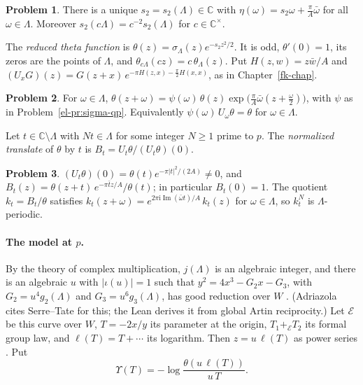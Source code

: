 \documentclass[reqno]{amsart}
\newcounter{chap}
\theoremstyle{definition}
\newtheorem{problem}{Problem}[section]
\theoremstyle{plain}
\theoremstyle{remark}
\newcommand{\C}{\mathbb C}
\newcommand{\Ec}{\mathcal E}
\newcommand{\ii}{\mathrm i}
\newcommand{\pe}{+_{\Ec}}
\begin{document}
\begin{problem}\label{pr:s2}
There is a unique \(s_2=s_2(\Lambda)\in\C\) with \(\eta(\omega)=s_2\omega+\frac\pi A\bar\omega\) for all \(\omega\in\Lambda\).  Moreover \(s_2(c\Lambda)=c^{-2}s_2(\Lambda)\) for \(c\in\C^\times\).
\end{problem}

The \emph{reduced theta function} is \(\theta(z)=\sigma_\Lambda(z)e^{-s_2z^2/2}\).  It is odd, \(\theta'(0)=1\), its zeros are the points of \(\Lambda\), and \(\theta_{c\Lambda}(cz)=c\,\theta_\Lambda(z)\).  Put \(H(z,w)=z\bar w/A\) and \((U_xG)(z)=G(z+x)\,e^{-\pi H(z,x)-\frac\pi2H(x,x)}\), as in Chapter~\ref{fk-chap}.

\begin{problem}\label{pr:theta-qp}
For \(\omega\in\Lambda\), \(\theta(z+\omega)=\psi(\omega)\,\theta(z)\exp\big(\frac\pi A\bar\omega(z+\frac\omega2)\big)\), with \(\psi\) as in Problem~\ref{el-pr:sigma-qp}.  Equivalently \(\psi(\omega)\,U_\omega\theta=\theta\) for \(\omega\in\Lambda\).
\end{problem}

Let \(t\in\C\setminus\Lambda\) with \(Nt\in\Lambda\) for some integer \(N\ge1\) prime to \(p\).  The \emph{normalized translate} of \(\theta\) by \(t\) is \(B_t=U_t\theta/(U_t\theta)(0)\).

\begin{problem}\label{pr:Bt}
\((U_t\theta)(0)=\theta(t)e^{-\pi\lvert t\rvert^2/(2A)}\ne0\), and \(B_t(z)=\theta(z+t)\,e^{-\pi\bar tz/A}/\theta(t)\); in particular \(B_t(0)=1\).  The quotient \(k_t=B_t/\theta\) satisfies \(k_t(z+\omega)=e^{2\pi\ii\operatorname{Im}(\bar\omega t)/A}\,k_t(z)\) for \(\omega\in\Lambda\), so \(k_t^N\) is \(\Lambda\)-periodic.
\end{problem}

\paragraph{The model at \(p\).}  By the theory of complex multiplication, \(j(\Lambda)\) is an algebraic integer, and there is an algebraic \(u\) with \(\lvert\iota(u)\rvert=1\) such that \(y^2=4x^3-G_2x-G_3\), with \(G_2=u^4g_2(\Lambda)\) and \(G_3=u^6g_3(\Lambda)\), has good reduction over \(W\) \cite[Prop.~8.4]{Adr}.  (Adriazola cites Serre--Tate for this; the Lean derives it from global Artin reciprocity.)  Let \(\Ec\) be this curve over \(W\), \(T=-2x/y\) its parameter at the origin, \(T_1\pe T_2\) its formal group law, and \(\ell(T)=T+\cdots\) its logarithm.  Then \(z=u\,\ell(T)\) as power series \cite[\S8.2]{Adr}.  Put
\[
 \Upsilon(T)=-\log\frac{\theta(u\,\ell(T))}{u\,T}.
\]
\end{document}
